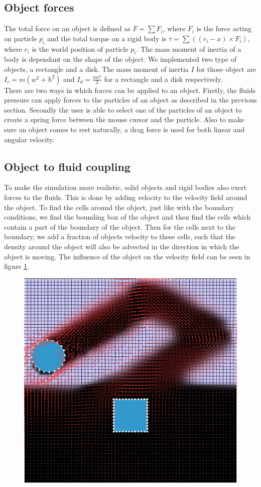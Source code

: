 \subsection{Object forces}
The total force on an object is defined as $F = \sum{F_i}$, where $F_i$ is the force acting on particle $p_i$ and the total torque on a rigid body is $\tau = \sum{((r_i - x) \times F_i)}$, where $r_i$ is the world position of particle $p_i$. The mass moment of inertia of a body is dependant on the shape of the object. We implemented two type of objects, a rectangle and a disk. The mass moment of inertia $I$ for those object are $I_r =  m (w^2 + h^2)$ and $I_d = \frac{mr^2}{2}$ for a rectangle and a disk respectively.\\
There are two ways in which forces can be applied to an object. Firstly, the fluids pressure can apply forces to the particles of an object as described in the previous section. Secondly the user is able to select one of the particles of an object to create a spring force between the mouse cursor and the particle. Also to make sure an object comes to rest naturally, a drag force is used for both linear and angular velocity.

\subsection{Object to fluid coupling}
To make the simulation more realistic, solid objects and rigid bodies also exert forces to the fluids. This is done by adding velocity to the velocity field around the object. To find the cells around the object, just like with the boundary conditions, we find the bounding box of the object and then find the cells which contain a part of the boundary of the object. Then for the cells next to the boundary, we add a fraction of objects velocity to these cells, such that the density around the object will also be advected in the direction in which the object is moving. The influence of the object on the velocity field can be seen in figure \ref{fig:objectfluid}.

\begin{figure}[!htb]
\centering
  \includegraphics[height=0.5\textwidth]{img/objectfluid}
  \label{fig:objectfluid}
\end{figure} 